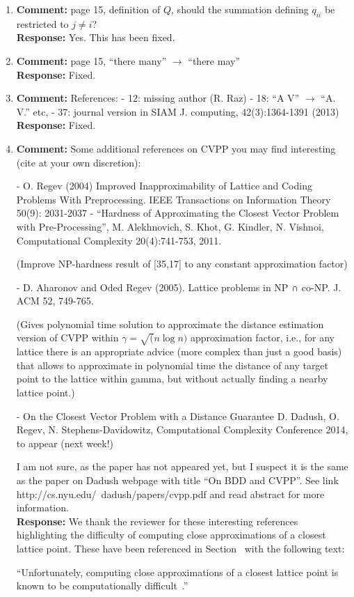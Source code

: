 \documentclass[a4paper,10pt]{article}
\begin{document}
\begin{enumerate}
\item\textbf{Comment:}  
page 15, definition of $Q$, should the summation defining $q_{ii}$ be restricted to $j\neq i$? 
\\\textbf{Response:}
Yes. This has been fixed.

\item\textbf{Comment:}  
page 15, ``there many'' $\to$ ``there may'' 
\\\textbf{Response:}
Fixed.

\item\textbf{Comment:}  
References: 
- 12: missing author (R. Raz) 
- 18: ``A V'' $\to$ ``A. V.'' etc, 
- 37: journal version in SIAM J. computing, 42(3):1364-1391 (2013) 
\\\textbf{Response:}
Fixed.

\item\textbf{Comment:}  
Some additional references on CVPP you may find interesting 
(cite at your own discretion): 

- O. Regev (2004) Improved Inapproximability of Lattice and Coding Problems With Preprocessing. IEEE Transactions on Information Theory 50(9): 2031-2037 
- ``Hardness of Approximating the Closest Vector Problem with Pre-Processing'', M. Alekhnovich, S. Khot, G. Kindler, N. Vishnoi, Computational Complexity 20(4):741-753, 2011. 

(Improve NP-hardness result of [35,17] to any constant approximation factor) 

- D. Aharonov and Oded Regev (2005). Lattice problems in NP ∩ co-NP. J. ACM 52, 749-765. 

(Gives polynomial time solution to approximate the distance estimation version of CVPP within $\gamma=\sqrt(n \log n)$ approximation factor, i.e., for any lattice there is an appropriate advice (more complex than just a good basis) that allows to approximate in polynomial time the distance of any target point to the lattice within gamma, but without actually finding a nearby lattice point.) 

- On the Closest Vector Problem with a Distance Guarantee 
D. Dadush, O. Regev, N. Stephens-Davidowitz, Computational Complexity Conference 2014, to appear (next week!) 

I am not sure, as the paper has not appeared yet, but I suspect it is the same as the paper on Dadush webpage with title ``On BDD and CVPP''. 
See link 
http://cs.nyu.edu/~dadush/papers/cvpp.pdf 
and read abstract for more information.
\\\textbf{Response:}
We thank the reviewer for these interesting references highlighting the difficulty of computing close approximations of a closest lattice point.  These have been referenced in Section~ with the following text:

``Unfortunately, computing close approximations of a closest lattice point is known to be computationally difficult~\cite{feige_inapproximability_2004,Regev_2004_inappox_lattice_with_preprocessing,Aharonov_Regev_2005,Aleknovish_hardness_with_preprocessing_2011,Dadush_cvp_with_distance_guarantee_2014}.''

\end{enumerate}




%

\end{document}
